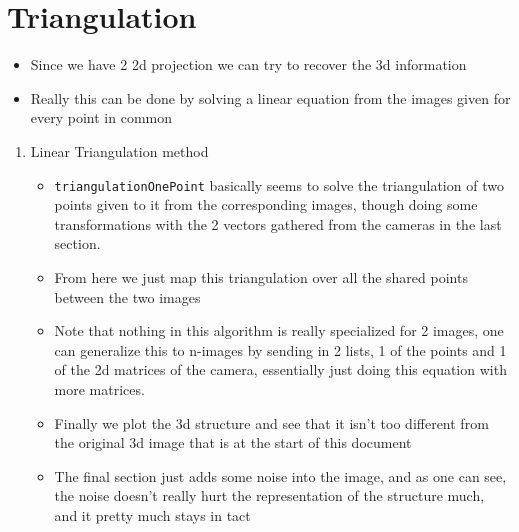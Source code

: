 \documentclass{article}
\begin{document}
\section{Triangulation}
\label{sec-5}
\begin{itemize}
\item Since we have 2 2d projection we can try to recover the 3d
information
\item Really this can be done by solving a linear equation from the images
given for every point in common
\end{itemize}
\begin{enumerate}
\item Linear Triangulation method
\label{sec-5-1}
\begin{itemize}
\item \texttt{triangulationOnePoint} basically seems to solve the triangulation of
two points given to it from the corresponding images, though doing
some transformations with the 2 vectors gathered from the cameras in
the last section.
\item From here we just map this triangulation over all the shared points
between the two images
\item Note that nothing in this algorithm is really specialized for 2
images, one can generalize this to n-images by sending in 2 lists, 1
of the points and 1 of the 2d matrices of the camera, essentially just
doing this equation with more matrices.
\item Finally we plot the 3d structure and see that it isn't too different
from the original 3d image that is at the start of this document
\item The final section just adds some noise into the image, and as one can
see, the noise doesn't really hurt the representation of the
structure much, and it pretty much stays in tact
\end{itemize}
\end{enumerate}
\end{document}
